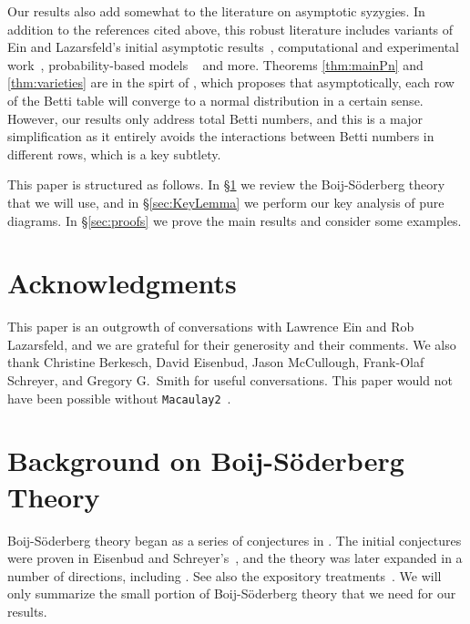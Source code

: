\documentclass[12pt]{amsart}
\theoremstyle{remark}
\begin{document}
 Our results also add somewhat to the literature on asymptotic syzygies.  In addition to the references cited above, this robust literature includes variants of Ein and Lazarsfeld's initial asymptotic results~\cite{bruce,CJW, EEL-quick, martinova, park-nonvanishing, raicu, zhou}, computational and experimental work~\cite{wouter,ppcomputations, bruce-erman-goldstein-yang}, probability-based models ~\cite{banerjee, booms-erman-yang, engstrom,dochtermann,erman-yang-flag} and more.
Theorems \ref{thm:mainPn} and \ref{thm:varieties} are in the spirt of \cite[Conjecture D]{EEL-random}, which proposes that asymptotically, each row of the Betti table will converge to a normal distribution in a certain sense.  However, our results
only address total Betti numbers, and this is a major simplification as it entirely avoids the interactions between Betti numbers in different rows, which is a key subtlety.



This paper is structured as follows.  In \S\ref{sec:BStheory} we review the Boij-S\"oderberg theory that we will use, and in \S\ref{sec:KeyLemma} we perform our key analysis of pure diagrams.  In \S\ref{sec:proofs} we prove the main results and consider some examples.

\section*{Acknowledgments}  This paper is an outgrowth of conversations with Lawrence Ein and Rob Lazarsfeld, and we are grateful for their generosity and their comments.  We also thank Christine Berkesch, David Eisenbud, Jason McCullough, Frank-Olaf Schreyer, and Gregory G.\ Smith for useful conversations.  This paper would not have been possible without {\tt Macaulay2}~\cite{M2}.

\section{Background on Boij-S\"oderberg Theory}\label{sec:BStheory}
Boij-S\"oderberg theory began as a series of conjectures in \cite{boij-sod1}.  The initial conjectures were proven in Eisenbud and Schreyer's~\cite{eis-schrey1}, and the theory was later expanded in a number of directions, including \cite{boij-sod2,eisenbud-erman,filtering, efw,eis-schrey2, supernatural, floystad-zipping}.    See also the expository treatments~\cite{eis-schrey-icm,floystad,fmp}.  We will only summarize the small portion of Boij-S\"oderberg theory that we need for our results.
\end{document}
